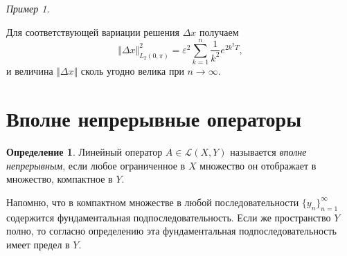 \documentclass[12pt,a4paper,titlepage,oneside]{book}
\theoremstyle{definition}
\newtheorem*{definition}{Определение}
\theoremstyle{plain}
\theoremstyle{break}
\theoremstyle{remark}
\theoremstyle{remark}
\newtheorem*{example}{Пример}
\theoremstyle{remark}
\theoremstyle{remark}
\theoremstyle{plain}
\theoremstyle{plain}
\begin{document}
\begin{example}
\begin{enumerate}
Для соответствующей вариации решения $\Delta x$ получаем
$$ \Vert  \Delta x  \Vert_{L_2(0, \pi)}^2 = \varepsilon ^2 \sum\limits_{k=1}^n \frac{1}{k^2} e^{2 k^2 T},$$
и величина $ \Vert  \Delta x  \Vert $ сколь угодно велика при $n \longrightarrow \infty.$

\end{enumerate}

\end{example}

\section{Вполне непрерывные операторы}
\begin{definition}Линейный оператор $A \in \mathcal{L}(X, Y)$ называется \textit{вполне непрерывным}, если любое ограниченное в $X$ множество он отображает в множество, компактное в $Y$.
\end{definition}
Напомню, что в компактном множестве в любой последовательности $\lbrace y_n \rbrace_{n=1}^{\infty}$ содержится фундаментальная подпоследовательность. Если же пространство $Y$ полно, то согласно определению эта фундаментальная подпоследовательность имеет предел в $Y$.
\end{document}
